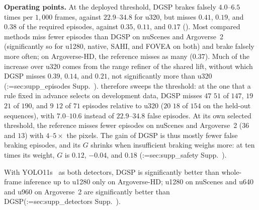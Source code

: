 \documentclass[10pt,twocolumn,letterpaper]{article}
\makeatletter
\newcommand{\method}{DGSP\xspace}
\newcommand{\G}{G}                %
\theoremstyle{definition}
\theoremstyle{remark}
\DeclareRobustCommand{\supp}[1]{\def\supp@list{}\@for\supp@i:=#1\do{\ifx\supp@list\@empty\edef\supp@list{S-\supp@i}\else\edef\supp@list{\supp@list,S-\supp@i}\fi}%
\edef\supp@cmd{\noexpand\Cref*{\supp@list}}Supp.~\supp@cmd}
\makeatother
\begin{document}
\noindent\textbf{Operating points.}
At the deployed threshold, \method brakes falsely $4.0$--$6.5$ times per $1{,}000$ frames, against $22.9$--$34.8$ for u320, but misses $0.41$, $0.19$, and $0.38$ of the required episodes, against $0.35$, $0.11$, and $0.17$ ().
Most compared methods miss fewer episodes than \method on nuScenes and Argoverse~2 (significantly so for u1280, native, SAHI, and FOVEA on both) and brake falsely more often; on Argoverse-HD, the reference misses as many ($0.37$).
Much of the increase over u320 comes from the range refiner of the shared lift, without which \method misses $0.39$, $0.14$, and $0.21$, not significantly more than u320 (\supp{sec:supp_episodes}).
 therefore sweeps the threshold: at the one that a rule fixed in advance selects on development data, \method misses $47$ \vs $51$ of $147$, $19$ \vs $21$ of $190$, and $9$ \vs $12$ of $71$ episodes relative to u320 ($20$ \vs $18$ of $154$ on the held-out sequences), with $7.0$--$10.6$ instead of $22.9$--$34.8$ false episodes.
At its own selected threshold, the reference misses fewer episodes on nuScenes and Argoverse~2 ($36$ and $13$) with $4$--$5\times$ the pixels.
The gain of \method is thus mostly fewer false braking episodes, and its $\G$ shrinks when insufficient braking weighs more: at ten times its weight, $\G$ is $0.12$, $-0.04$, and $0.18$ (\supp{sec:supp_safety}).

With YOLO11s~\cite{yolo11} as both detectors, \method is significantly better than whole-frame inference up to u1280 only on Argoverse-HD; u1280 on nuScenes and u640 and u960 on Argoverse~2 are significantly better than \method (\supp{sec:supp_detectors}).
\end{document}
